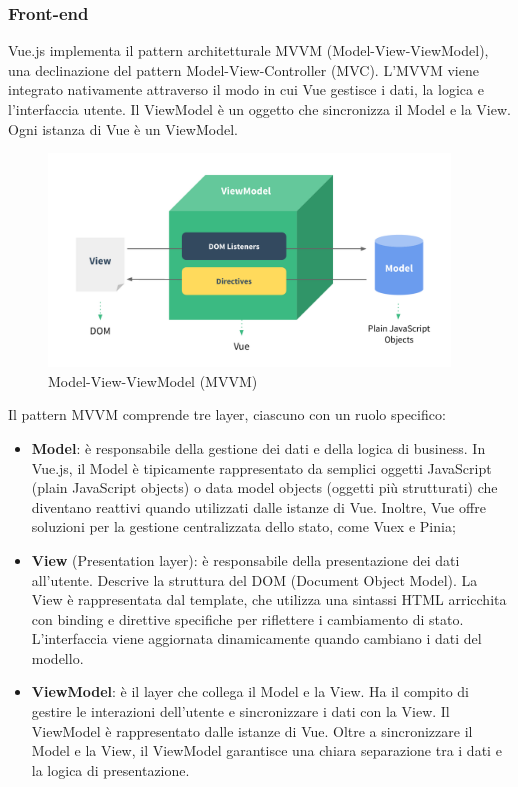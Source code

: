 \subsubsection{Front-end}

\par Vue.js implementa il pattern architetturale MVVM (Model-View-ViewModel), una declinazione del pattern Model-View-Controller (MVC). L’MVVM viene integrato nativamente attraverso il modo in cui Vue gestisce i dati, la logica e l'interfaccia utente. Il ViewModel è un oggetto che sincronizza il Model e la View. Ogni istanza di Vue è un ViewModel.

\begin{figure}[H]
  \centering
  \includegraphics[width=0.95\textwidth]{assets/Frontend/architettura_mvvm.png}
  \caption{Model-View-ViewModel (MVVM)}
\end{figure}

\par Il pattern MVVM comprende tre layer, ciascuno con un ruolo specifico:
\begin{itemize}
  \item \textbf{Model}: è responsabile della gestione dei dati e della logica di business. In Vue.js, il Model è tipicamente rappresentato da semplici oggetti JavaScript (plain JavaScript objects) o data model objects (oggetti più strutturati) che diventano reattivi quando utilizzati dalle istanze di Vue. Inoltre, Vue offre soluzioni per la gestione centralizzata dello stato, come Vuex e Pinia;
  \item \textbf{View} (Presentation layer): è responsabile della presentazione dei dati all'utente. Descrive la struttura del DOM (Document Object Model). La View è rappresentata dal template, che utilizza una sintassi HTML arricchita con binding e direttive specifiche per riflettere i cambiamento di stato. L'interfaccia viene aggiornata dinamicamente quando cambiano i dati del modello.
  \item \textbf{ViewModel}: è il layer che collega il Model e la View. Ha il compito di gestire le interazioni dell'utente e sincronizzare i dati con la View. Il ViewModel è rappresentato dalle istanze di Vue. Oltre a sincronizzare il Model e la View, il ViewModel garantisce una chiara separazione tra i dati e la logica di presentazione.
\end{itemize} 

